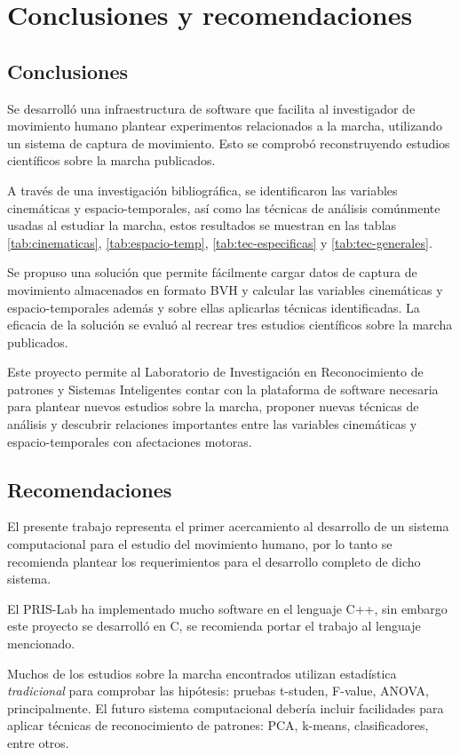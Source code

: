 \chapter{Conclusiones y recomendaciones}

\section{Conclusiones}

Se desarrolló una infraestructura de software que facilita al investigador de movimiento humano plantear experimentos relacionados a la marcha, utilizando un sistema de captura de movimiento. Esto se comprobó reconstruyendo estudios científicos sobre la marcha publicados.

A través de una investigación bibliográfica, se identificaron las variables cinemáticas y espacio-temporales, así como las técnicas de análisis comúnmente usadas al estudiar la marcha, estos resultados se muestran en las tablas \ref{tab:cinematicas}, \ref{tab:espacio-temp}, \ref{tab:tec-especificas} y \ref{tab:tec-generales}.

Se propuso una solución que permite fácilmente cargar datos de captura de movimiento almacenados en formato BVH y calcular las variables cinemáticas y espacio-temporales además y sobre ellas aplicarlas técnicas identificadas. La eficacia de la solución se evaluó al recrear tres estudios científicos sobre la marcha publicados.

Este proyecto permite al Laboratorio de Investigación en Reconocimiento de patrones y Sistemas Inteligentes contar con la plataforma de software necesaria para plantear nuevos estudios sobre la marcha, proponer nuevas técnicas de análisis y descubrir relaciones importantes entre las variables cinemáticas y espacio-temporales con afectaciones motoras. 


\section{Recomendaciones}

El presente trabajo representa el primer acercamiento al desarrollo de un sistema computacional para el estudio del movimiento humano, por lo tanto se recomienda plantear los requerimientos para el desarrollo completo de dicho sistema. 

El PRIS-Lab ha implementado mucho software en el lenguaje C++, sin embargo este proyecto se desarrolló en C, se recomienda portar el trabajo al lenguaje mencionado.

Muchos de los estudios sobre la marcha encontrados utilizan estadística \emph{tradicional} para comprobar las hipótesis: pruebas t-studen, F-value, ANOVA, principalmente. El futuro sistema computacional debería incluir facilidades para aplicar técnicas de reconocimiento de patrones: PCA, k-means, clasificadores, entre otros. 


